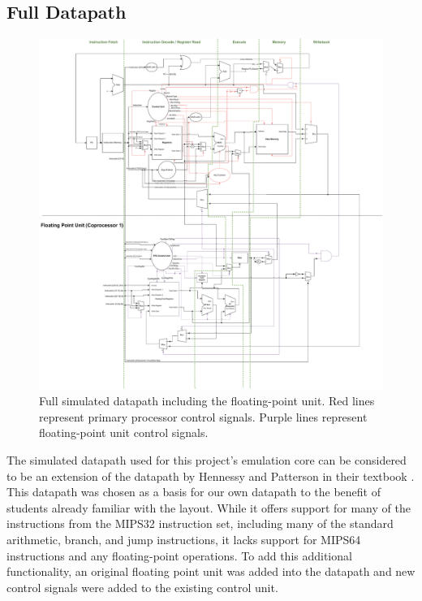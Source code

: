 \documentclass[
    paper=letter,
    parskip=half,
    fontsize=12pt,
    titlepage=firstiscover,
    toc=bibliography,
    numbers=endperiod
]{scrartcl}
\begin{document}
\subsection{Full Datapath}

\begin{figure}[H]
    \includegraphics[width=\textwidth]{swim-datapath}
    \caption{Full simulated datapath including the floating-point unit. Red lines represent primary processor control signals. Purple lines represent floating-point unit control signals.}
\end{figure}

The simulated datapath used for this project's emulation core can be
considered to be an extension of the datapath by Hennessy and Patterson
in their textbook \cite{hennessy-patterson}. This datapath was chosen as
a basis for our own datapath to the benefit of students already familiar
with the layout. While it offers support for many of the instructions
from the MIPS32 instruction set, including many of the standard
arithmetic, branch, and jump instructions, it lacks support for MIPS64
instructions and any floating-point operations. To add this additional
functionality, an original floating point unit was added into the
datapath and new control signals were added to the existing control
unit.
\end{document}
